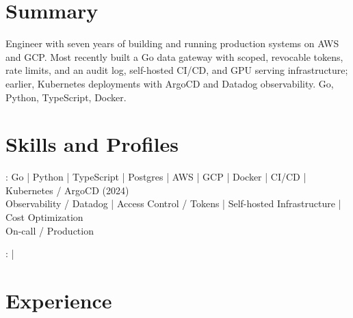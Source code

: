 \documentclass[print]{jack-resume}
\begin{document}
\pagecolor{darkmodeBackground}


\begin{minipage}[t][1cm][t]{.03\textwidth}
    \hfill
\end{minipage}

\section{Summary}
Engineer with seven years of building and running production systems on AWS and GCP. Most recently built a Go data gateway with scoped, revocable tokens, rate limits, and an audit log, self-hosted CI/CD, and GPU serving infrastructure; earlier, Kubernetes deployments with ArgoCD and Datadog observability. Go, Python, TypeScript, Docker.
\sectionsep

\section{Skills and Profiles}
:
Go \hfill | \hfill
Python \hfill | \hfill
TypeScript \hfill | \hfill
Postgres \hfill | \hfill
AWS \hfill | \hfill
GCP \hfill | \hfill
Docker \hfill | \hfill
CI/CD \hfill | \hfill
Kubernetes / ArgoCD (2024) \\
\hspace{1.0cm} Observability / Datadog \hfill | \hfill
Access Control / Tokens \hfill | \hfill
Self-hosted Infrastructure \hfill | \hfill
Cost Optimization \\
\hspace{1.0cm} On-call / Production \\

\raggedright{
    :
      \href{https://www.linkedin.com/in/jack-sturtevant/}{ \ExternalLink} |
     \href{https://github.com/jacksturt}{ \ExternalLink}}

\section{Experience}
\end{document}
